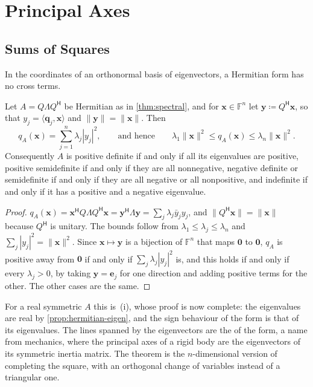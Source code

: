 \section{Principal Axes}
\label{sec:principal-axes}

\subsection{Sums of Squares}

In the coordinates of an orthonormal basis of eigenvectors, a Hermitian form has no cross terms.

\begin{theorem}
\label{thm:principal-axes}
Let $A=Q\Lambda Q^{\mathsf H}$ be Hermitian as in \cref{thm:spectral}, and for $\mathbf x\in\mathbb F^n$ let $\mathbf y\coloneqq Q^{\mathsf H}\mathbf x$, so that $y_j=\langle\mathbf q_j,\mathbf x\rangle$ and $\|\mathbf y\|=\|\mathbf x\|$. Then
\[
q_A(\mathbf x)=\sum_{j=1}^n\lambda_j|y_j|^2,\qquad\text{and hence}\qquad\lambda_1\|\mathbf x\|^2\le q_A(\mathbf x)\le\lambda_n\|\mathbf x\|^2 .
\]
Consequently $A$ is positive definite if and only if all its eigenvalues are positive, positive semidefinite if and only if they are all nonnegative, negative definite or semidefinite if and only if they are all negative or all nonpositive, and indefinite if and only if it has a positive and a negative eigenvalue.
\end{theorem}

\begin{proof}
$q_A(\mathbf x)=\mathbf x^{\mathsf H}Q\Lambda Q^{\mathsf H}\mathbf x=\mathbf y^{\mathsf H}\Lambda\mathbf y=\sum_j\lambda_j\bar y_jy_j$, and $\|Q^{\mathsf H}\mathbf x\|=\|\mathbf x\|$ because $Q^{\mathsf H}$ is unitary. The bounds follow from $\lambda_1\le\lambda_j\le\lambda_n$ and $\sum_j|y_j|^2=\|\mathbf x\|^2$. Since $\mathbf x\mapsto\mathbf y$ is a bijection of $\mathbb F^n$ that maps $\mathbf 0$ to $\mathbf 0$, $q_A$ is positive away from $\mathbf 0$ if and only if $\sum_j\lambda_j|y_j|^2$ is, and this holds if and only if every $\lambda_j>0$, by taking $\mathbf y=\mathbf e_j$ for one direction and adding positive terms for the other. The other cases are the same.
\end{proof}

For a real symmetric $A$ this is \,(i), whose proof is now complete: the eigenvalues are real by \cref{prop:hermitian-eigen}, and the sign behaviour of the form is that of its eigenvalues. The lines spanned by the eigenvectors are the  of the form, a name from mechanics, where the principal axes of a rigid body are the eigenvectors of its symmetric inertia matrix. The theorem is the $n$-dimensional version of completing the square, with an orthogonal change of variables instead of a triangular one.

